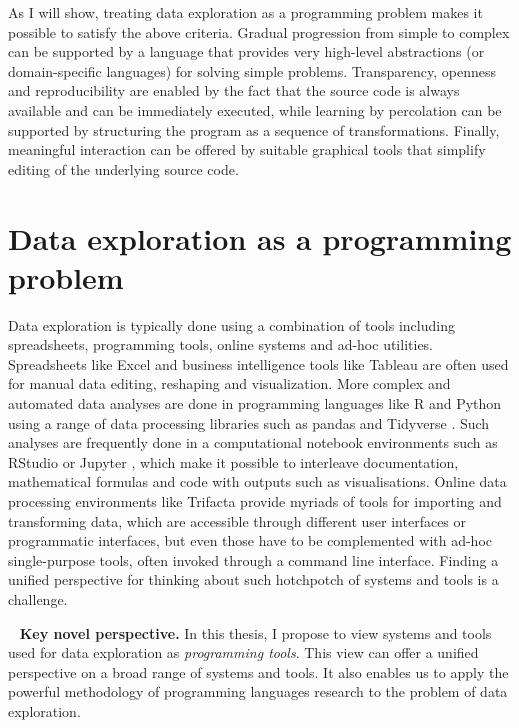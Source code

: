 \documentclass[fleqn,11pt]{report}
\theoremstyle{definition}
\DeclareRobustCommand{\keyideabox}[3]{\begin{tcolorbox}[breakable,
  boxsep=10pt,left=0pt,right=0pt,top=0pt,bottom=0pt,width=\dimexpr\textwidth\relax,
  colback=gray!20,colframe=gray!20,
  enlarge bottom by=5pt,enlarge top by=5pt,
  arc=0pt,outer arc=0pt]
\lettrine[lraise=0.3]{\LARGE #1}{~}
\textbf{#2.} #3
\end{tcolorbox}
}
\begin{document}
As I will show, treating data exploration as a programming problem makes it possible to satisfy
the above criteria. Gradual progression from simple to complex can be supported by a language
that provides very high-level abstractions (or domain-specific languages) for solving simple
problems. Transparency, openness and reproducibility are enabled by the fact that the source code
is always available and can be immediately executed, while learning
by percolation can be supported by structuring the program as a sequence of transformations.
Finally, meaningful interaction can be offered by suitable graphical tools that simplify editing
of the underlying source code.

\section{Data exploration as a programming problem}
\label{sec:intro-dataprog}

Data exploration is typically done using a combination of tools including spreadsheets,
programming tools, online systems and ad-hoc utilities. Spreadsheets like Excel and business
intelligence tools like Tableau \citep{wesley-2011-tableau} are often used for manual data
editing, reshaping and visualization. More complex and automated data analyses are done in
programming languages like R and Python using a range of data processing libraries such as pandas
and Tidyverse \citep{wickham-2019-tidyverse}. Such analyses are frequently done in a computational
notebook environments such as RStudio or Jupyter \citep{kluyver-2016-jupyter}, which make
it possible to interleave documentation, mathematical formulas and code with outputs such as
visualisations. Online data processing environments like Trifacta provide myriads of tools for
importing and transforming data, which are accessible through different user interfaces or
programmatic interfaces, but even those have to be complemented with ad-hoc single-purpose tools,
often invoked through a command line interface. Finding a unified perspective for thinking about
such hotchpotch of systems and tools is a challenge.

\keyideabox{\faLightbulbO}{Key novel perspective}{In this thesis, I propose to view systems and tools used for
data exploration as \emph{programming tools}. This view can offer a unified perspective on a
broad range of systems and tools. It also enables us to apply the powerful
methodology of programming languages research to the problem of data exploration.}
\end{document}
